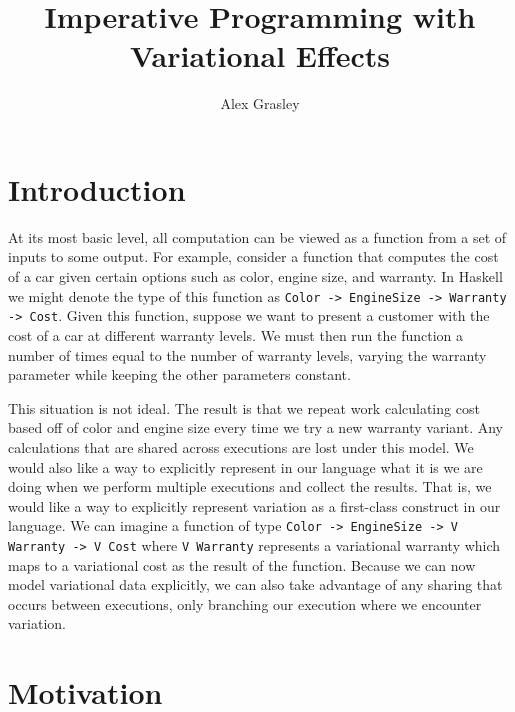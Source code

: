 \documentclass[letterpaper,10pt,onecolumn]{article}
\title{Imperative Programming with Variational Effects}
\author{Alex Grasley}
\begin{document}
\maketitle

\section{Introduction}

At its most basic level, all computation can be viewed as a function from a set of inputs to some
output. For example, consider a function that computes the cost of a car given certain options such
as color, engine size, and warranty. In Haskell we might denote the type of this function as
\texttt{Color -> EngineSize -> Warranty -> Cost}. Given this function, suppose we want to present
a customer with the cost of a car at different warranty levels. We must then run the function a number of
times equal to the number of warranty levels, varying the warranty parameter while keeping the other
parameters constant.

This situation is not ideal. The result is that we repeat work calculating cost based off of color and engine
size every time we try a new warranty variant. Any calculations that are shared across executions are
lost under this model. We would also like a way to explicitly represent in our language what it is 
we are doing when we perform multiple executions and collect the results. That is, we would like a way
to explicitly represent variation as a first-class construct in our language. We can imagine a function
of type \texttt{Color -> EngineSize -> V Warranty -> V Cost} where \texttt{V Warranty} represents a
variational warranty which maps to a variational cost as the result of the function. Because we can
now model variational data explicitly, we can also take advantage of any sharing that occurs between
executions, only branching our execution where we encounter variation.


\section{Motivation}
\end{document}
